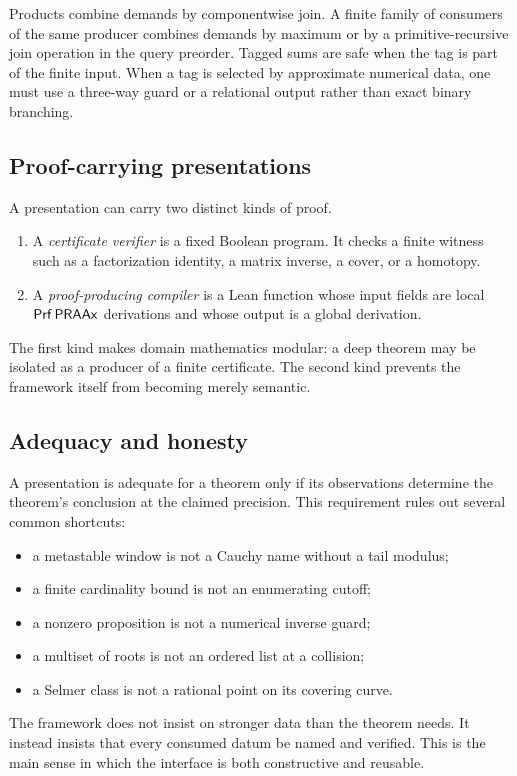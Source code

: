 Products combine demands by componentwise join.  A finite family of consumers
of the same producer combines demands by maximum or by a primitive-recursive
join operation in the query preorder.  Tagged sums are safe when the tag is
part of the finite input.  When a tag is selected by approximate numerical
data, one must use a three-way guard or a relational output rather than exact
binary branching.

\subsection{Proof-carrying presentations}

A presentation can carry two distinct kinds of proof.

\begin{enumerate}
\item A \emph{certificate verifier} is a fixed Boolean program.  It checks a
finite witness such as a factorization identity, a matrix inverse, a cover, or
a homotopy.
\item A \emph{proof-producing compiler} is a Lean function whose input fields
are local \(\mathsf{Prf}\,\mathsf{PRAAx}\) derivations and whose output is a global derivation.
\end{enumerate}

The first kind makes domain mathematics modular: a deep theorem may be
isolated as a producer of a finite certificate.  The second kind prevents the
framework itself from becoming merely semantic.

\subsection{Adequacy and honesty}

A presentation is adequate for a theorem only if its observations determine
the theorem's conclusion at the claimed precision.  This requirement rules
out several common shortcuts:
\begin{itemize}
\item a metastable window is not a Cauchy name without a tail modulus;
\item a finite cardinality bound is not an enumerating cutoff;
\item a nonzero proposition is not a numerical inverse guard;
\item a multiset of roots is not an ordered list at a collision;
\item a Selmer class is not a rational point on its covering curve.
\end{itemize}

The framework does not insist on stronger data than the theorem needs.  It
instead insists that every consumed datum be named and verified.  This is the
main sense in which the interface is both constructive and reusable.
